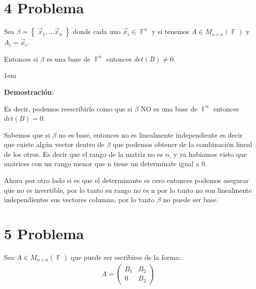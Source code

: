 \documentclass[12pt, fleqn]{article}                             %
\newenvironment{SmallIndentation}[1][0.75em]                    %
        {\begin{adjustwidth}{#1}{}\begin{footnotesize}}             %
        {\end{footnotesize}\end{adjustwidth}}                       %
\theoremstyle{break}                                            %
\DeclareMathOperator \GenericField {\mathbb{F}}                 %
\newcommand{\Set}[1]    {\left\{ \; #1 \; \right\}}             %
\newcommand{\pVector}[1]                                        %
        { \ensuremath{\begin{pmatrix}#1\end{pmatrix}} }             %
\begin{document}
\clearpage
\section{4 Problema}

    Sea $\beta = \Set{\vec x_1, \dots \vec x_n}$ donde cada uno $\vec x_i \in \GenericField^n$
    y si tenemos $A \in M_{n \times n}(\GenericField)$ y $A_i = \vec x_i$.

    Entonces si $\beta$ es una base de $\GenericField^n$ entonces $det(B) \neq 0$.

     \begin{SmallIndentation}[1em]
         \textbf{Demostración}:
         
        Es decir, podemos reescribirlo como que si $\beta$ NO es una base de $\GenericField^n$
        entonces $det(B) = 0$.

        Sabemos que si $\beta$ no es base, entonces no es linealmente independiente es decir
        que existe algún vector dentro de $\beta$ que podemos obtener de la combinación lineal
        de los otros. Es decir que el rango de la matriz no es $n$, y ya habiamos visto que matrices
        con un rango menor que n tiene un determinate igual a 0.

        Ahora por otro lado si es que el determinante es cero entonces podemos asegurar que no
        es invertible, por lo tanto su rango no es n por lo tanto no son linealmente independientes
        sus vectores columna, por lo tanto $\beta$ no puede ser base.

     \end{SmallIndentation}



\clearpage
\section{5 Problema}

    Sea $A \in M_{n \times n}(\GenericField)$ que puede ser escribirse de la forma:
    \begin{align*}
        A = \pVector{B_1 & B_2 \\ 0 & B_3}
    \end{align*}
\end{document}
